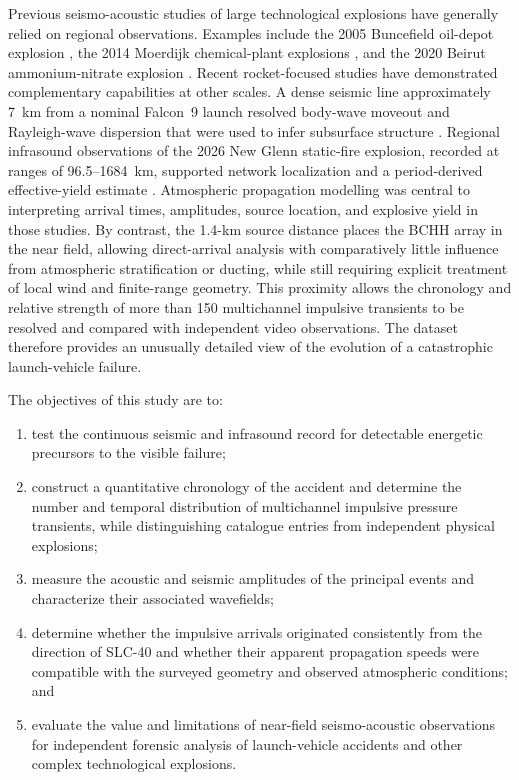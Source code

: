 \documentclass[]{seismica}
\begin{document}
Previous seismo-acoustic studies of large technological explosions have
generally relied on regional observations. Examples include the 2005 Buncefield
oil-depot explosion \citep{ottemoller_2008,ceranna_2009,green_2008}, the 2014
Moerdijk chemical-plant explosions \citep{smink_2019}, and the 2020 Beirut
ammonium-nitrate explosion \citep{pilger_beirut_2021,kim_pasyanos_2022}.
Recent rocket-focused studies have demonstrated complementary capabilities at
other scales. A dense seismic line approximately 7~km from a nominal Falcon~9
launch resolved body-wave moveout and Rayleigh-wave dispersion that were used
to infer subsurface structure \citep{schuster_rocketquake_2025}. Regional
infrasound observations of the 2026 New Glenn static-fire explosion, recorded
at ranges of 96.5--1684~km, supported network localization and a
period-derived effective-yield estimate \citep{silber_scamfer_newglenn_2026}.
Atmospheric propagation modelling was central to interpreting arrival times,
amplitudes, source location, and explosive yield in those studies. By contrast,
the 1.4-km source distance places the BCHH array in the near field, allowing
direct-arrival analysis with comparatively little influence from atmospheric
stratification or ducting, while still requiring explicit treatment of local
wind and finite-range geometry. This proximity allows the chronology and
relative strength of more than 150 multichannel impulsive transients to be resolved
and compared with independent video observations. The dataset therefore
provides an unusually detailed view of the evolution of a catastrophic
launch-vehicle failure.

The objectives of this study are to:
\begin{enumerate}
  \item test the continuous seismic and infrasound record for detectable
        energetic precursors to the visible failure;
  \item construct a quantitative chronology of the accident and determine the
        number and temporal distribution of multichannel impulsive pressure
        transients, while distinguishing catalogue entries from independent
        physical explosions;
  \item measure the acoustic and seismic amplitudes of the principal events
        and characterize their associated wavefields;
  \item determine whether the impulsive arrivals originated consistently from
        the direction of SLC-40 and whether their apparent propagation speeds
        were compatible with the surveyed geometry and observed atmospheric
        conditions; and
  \item evaluate the value and limitations of near-field seismo-acoustic
        observations for independent forensic analysis of launch-vehicle
        accidents and other complex technological explosions.
\end{enumerate}
\end{document}
